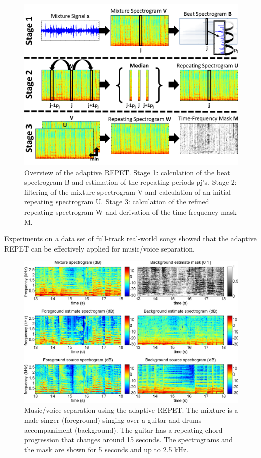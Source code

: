 \documentclass{article}
\begin{document}
\begin{figure}[!htb]
\centering
\includegraphics[width=\columnwidth]{Images/repet_adaptive_overview.png}
\caption{Overview of the adaptive REPET. Stage 1: calculation of the beat spectrogram B and estimation of the repeating periods pj’s. Stage 2: filtering of the mixture spectrogram V and calculation of an initial repeating spectrogram U. Stage 3: calculation of the refined repeating spectrogram W and derivation of the time-frequency mask M.}
\label{fig:repet_adaptive_overview}
\end{figure}

Experiments on a data set of full-track real-world songs showed that the adaptive REPET can be effectively applied for music/voice separation.

\begin{figure}[!htb]
\centering
\includegraphics[width=\columnwidth]{Images/repet_adaptive_example.png}
\caption{Music/voice separation using the adaptive REPET. The mixture is a male singer (foreground) singing over a guitar and drums accompaniment (background). The guitar has a repeating chord progression that changes around 15 seconds. The spectrograms and the mask are shown for 5 seconds and up to 2.5 kHz.}
\label{fig:repet_adaptive_example}
\end{figure}
\end{document}
